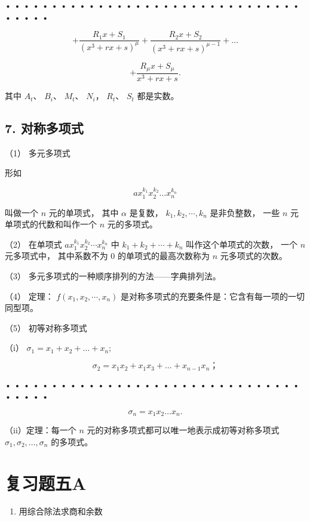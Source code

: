 • • • • • • • • • • • • • • • • • • • • • • • • • • • • • • • • • • • •
•

\[
+ \frac {R _ {1} x + S _ {1}}{(x ^ {3} + r x + s) ^ {\mu}} + \frac {R _ {2} x + S _ {2}}{(x ^ {3} + r x + s) ^ {\mu - 1}} + \dots
\]

\[
+ \frac {R _ {\mu} x + S _ {\mu}}{x ^ {3} + r x + s}.
\]

其中 \(A_{t}\)、 \(B_{i}\)、 \(M_{t}\)、 \(N_{i}\)， \(R_{t}\)、
\(S_{t}\) 都是实数。

\subsection{7. 对称多项式}

（1） 多元多项式

形如

\[
a x _ {1} ^ {k _ {1}} x _ {2} ^ {k _ {2}} \dots x _ {n} ^ {k _ {n}}
\]

叫做一个 \(n\) 元的单项式， 其中 \(\alpha\) 是复数，
\(k_{1}, k_{2}, \cdots, k_{n}\) 是非负整数， 一些 \(n\)
元单项式的代数和叫作一个 \(n\) 元的多项式。

（2） 在单项式 \(ax_1^{k_1}x_2^{k_2}\cdots x_n^{k_n}\) 中
\(k_1 + k_2 + \cdots + k_n\) 叫作这个单项式的次数， 一个 \(n\)
元多项式中， 其中系数不为 0 的单项式的最高次数称为 \(n\)
元多项式的次数。

（3） 多元多项式的一种顺序排列的方法------字典排列法。

（4） 定理： \(f(x_{1}, x_{2}, \cdots, x_{n})\) 是对称多项式的充要条件是：它含有每一项的一切同型项。

（5） 初等对称多项式

（i） \(\sigma_{1} = x_{1} + x_{2} + \dots +x_{n};\)

\[
\sigma_ {2} = x _ {1} x _ {2} + x _ {1} x _ {3} + \dots + x _ {n - 1} x _ {n}\text{；}
\]

• • • • • • • • • • • • • • • • • • • • • • • • • • • • • • • • • • • •
•

\[
\sigma_ {n} = x _ {1} x _ {2} \dots x _ {n}.
\]

（ii）定理：每一个 \(n\) 元的对称多项式都可以唯一地表示成初等对称多项式
\(\sigma_{1},\sigma_{2},\dots,\sigma_{n}\) 的多项式。

\section{复习题五A}

\begin{enumerate}
\item
  用综合除法求商和余数
\end{enumerate}

